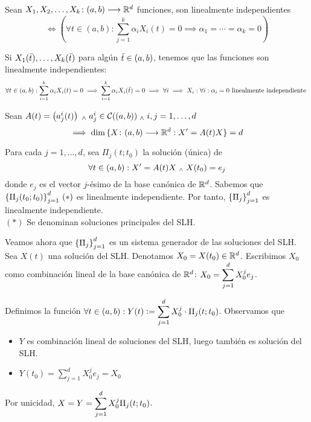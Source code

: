 \begin{defn}
	Sean $X_1, X_2, \ldots, X_k \colon (a, b) \longrightarrow \mathbb{R}^d$ funciones, son linealmente independientes
	\[\iff \left(\forall t \in (a, b) : \sum_{j=1}^{k} \alpha_i X_i (t) = 0 \implies \alpha_1 = \cdots = \alpha_k = 0 \right)\]
\end{defn}

Si $X_1(\Bar{t}) , \dots , X_k(\Bar{t})$ para algún $\Bar{t} \in (a,b)$, tenemos que las funciones son linealmente independientes:
\[\forall t \in (a,b) : \sum_{i=1}^k \alpha_i X_i(t) = 0 \implies \sum_{i=1}^k \alpha_i X_i(\Bar{t}) = 0 \implies \forall i \implies X_i : \forall i : \alpha_i = 0  \text{ linealmente independiente }\]


\begin{prop}
	Sean $A(t) = \left(a^i_j(t)\right) \; _{\wedge} \; a^i_j \in \mathcal{C}((a,b)) \; _{\wedge} \; i,j=1,\ldots,d$
	\[\implies \dim{\{X \colon (a,b) \longrightarrow \mathbb{R}^d : X'=A(t)X\}} = d\]
	\begin{dem}
		Para cada $j=1, \dots, d$, sea $\Pi_j(t;t_0)$ la solución (única) de
		\[\forall t \in (a,b) : X'=A(t)X \; _{\wedge} \; X(t_0) = e_j\]
		donde $e_j$ es el vector $j$-ésimo de la base canónica de $\mathbb{R}^d$. Sabemos que $\displaystyle \left\{\Pi_j(t_0; t_0)\right\}_{j=1}^d \,(*)$ es linealmente independiente. Por tanto, $\displaystyle \left\{\Pi_j\right\}_{j=1}^d$ es linealmente independiente. \\
		\hspace*{\fill} $(*)$ Se denominan soluciones principales del SLH.

		Veamos ahora que $\displaystyle \left\{\Pi_j\right\}_{j=1}^d$ es un sistema generador de las soluciones del SLH. Sea $X(t)$ una solución del SLH. Denotamos $X_0=X(t_0) \in \mathbb{R}^d$. Escribimos $X_0$ como combinación lineal de la base canónica de $\mathbb{R}^d$: $\displaystyle X_0 = \sum_{j=1}^{d} X_0^j e_j$.

		Definimos la función $\displaystyle \forall t \in (a, b) : Y(t)\vcentcolon= \sum_{j=1}^{d} X_0^j \cdot \Pi_j(t;t_0)$. Observamos que
		\begin{itemize}
			\item $Y$ es combinación lineal de soluciones del SLH, luego también es solución del SLH.
			\item $Y(t_0) = \sum_{j=1}^{d} X_0^j e_j = X_0$
		\end{itemize}
		Por unicidad, $\displaystyle X = Y = \sum_{j=1}^{d} X_0^j \Pi_j(t;t_0)$.
	\end{dem}
\end{prop}

